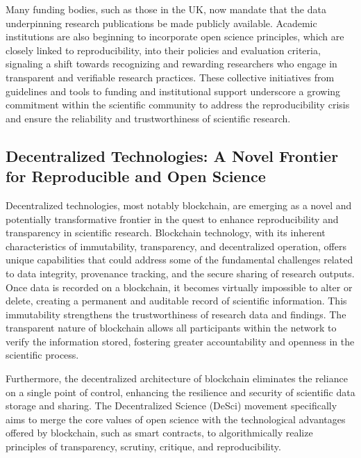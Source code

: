 \documentclass{article}
\begin{document}
Many funding bodies, such as those in the UK, now mandate that the data underpinning research publications be made publicly available. Academic institutions are also beginning to incorporate open science principles, which are closely linked to reproducibility, into their policies and evaluation criteria, signaling a shift towards recognizing and rewarding researchers who engage in transparent and verifiable research practices. These collective initiatives from guidelines and tools to funding and institutional support underscore a growing commitment within the scientific community to address the reproducibility crisis and ensure the reliability and trustworthiness of scientific research.

\subsection{Decentralized Technologies: A Novel Frontier for Reproducible and Open Science}

Decentralized technologies, most notably blockchain, are emerging as a novel and potentially transformative frontier in the quest to enhance reproducibility and transparency in scientific research. Blockchain technology, with its inherent characteristics of immutability, transparency, and decentralized operation, offers unique capabilities that could address some of the fundamental challenges related to data integrity, provenance tracking, and the secure sharing of research outputs. Once data is recorded on a blockchain, it becomes virtually impossible to alter or delete, creating a permanent and auditable record of scientific information. This immutability strengthens the trustworthiness of research data and findings. The transparent nature of blockchain allows all participants within the network to verify the information stored, fostering greater accountability and openness in the scientific process.

Furthermore, the decentralized architecture of blockchain eliminates the reliance on a single point of control, enhancing the resilience and security of scientific data storage and sharing. The Decentralized Science (DeSci) movement specifically aims to merge the core values of open science with the technological advantages offered by blockchain, such as smart contracts, to algorithmically realize principles of transparency, scrutiny, critique, and reproducibility.
\end{document}
